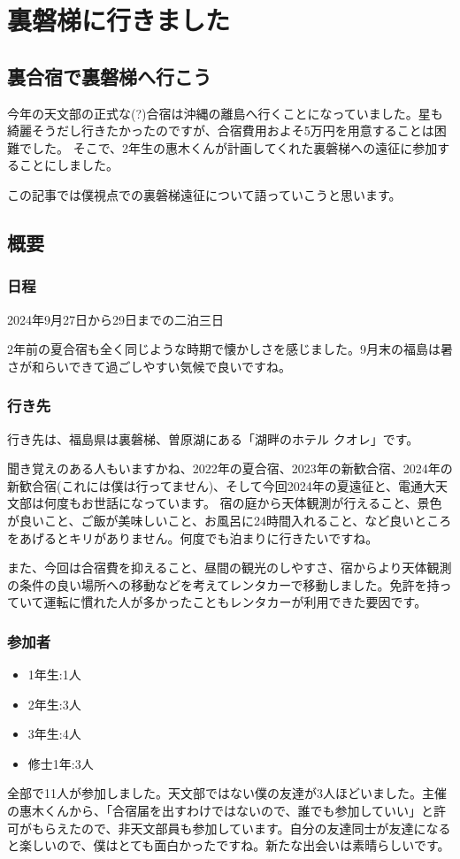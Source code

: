 \documentclass[../main]{subfiles}
\begin{document}
\chapter{裏磐梯に行きました} %

\noindent

\section{裏合宿で裏磐梯へ行こう}
今年の天文部の正式な(?)合宿は沖縄の離島へ行くことになっていました。星も綺麗そうだし行きたかったのですが、合宿費用およそ5万円を用意することは困難でした。
そこで、2年生の惠木くんが計画してくれた裏磐梯への遠征に参加することにしました。

この記事では僕視点での裏磐梯遠征について語っていこうと思います。

\section{概要}
\subsection{日程}
2024年9月27日から29日までの二泊三日

2年前の夏合宿も全く同じような時期で懐かしさを感じました。9月末の福島は暑さが和らいできて過ごしやすい気候で良いですね。
\subsection{行き先}
行き先は、福島県は裏磐梯、曽原湖にある「湖畔のホテル クオレ」です。


聞き覚えのある人もいますかね、2022年の夏合宿、2023年の新歓合宿、2024年の新歓合宿(これには僕は行ってません)、そして今回2024年の夏遠征と、電通大天文部は何度もお世話になっています。
宿の庭から天体観測が行えること、景色が良いこと、ご飯が美味しいこと、お風呂に24時間入れること、など良いところをあげるとキリがありません。何度でも泊まりに行きたいですね。

また、今回は合宿費を抑えること、昼間の観光のしやすさ、宿からより天体観測の条件の良い場所への移動などを考えてレンタカーで移動しました。免許を持っていて運転に慣れた人が多かったこともレンタカーが利用できた要因です。


\subsection{参加者}
\begin{itemize}
\item 1年生:1人
\item 2年生:3人
\item 3年生:4人
\item 修士1年:3人
\end{itemize}
全部で11人が参加しました。天文部ではない僕の友達が3人ほどいました。主催の惠木くんから、「合宿届を出すわけではないので、誰でも参加していい」と許可がもらえたので、非天文部員も参加しています。自分の友達同士が友達になると楽しいので、僕はとても面白かったですね。新たな出会いは素晴らしいです。
\end{document}
